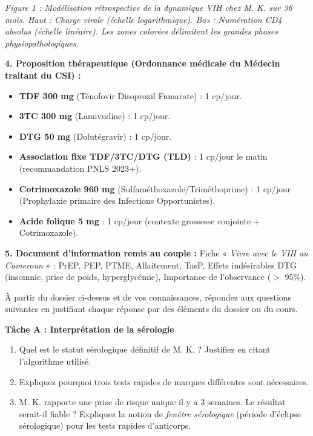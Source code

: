 \documentclass[11pt]{article}
\newcounter{popsec}
\newcounter{popsub}
\newcommand{\courssub}[1]{%
  \stepcounter{popsub}%
  \par\vspace{9pt}\noindent{\popxbold\fontsize{11.5}{13}\selectfont\color{popink}{\color{poporange}\thepopsec.\thepopsub}\hspace{6pt}#1}\par\nopagebreak\vspace{4pt}
}
\begin{document}
\begin{center}
\textit{Figure 1 : Modélisation rétrospective de la dynamique VIH chez M. K. sur 36 mois. Haut : Charge virale (échelle logarithmique). Bas : Numération CD4 absolus (échelle linéaire). Les zones colorées délimitent les grandes phases physiopathologiques.}
\end{center}

\textbf{4. Proposition thérapeutique (Ordonnance médicale du Médecin traitant du CSI) :}
\begin{itemize}
    \item \textbf{TDF 300 mg} (Ténofovir Disoproxil Fumarate) : 1 cp/jour.
    \item \textbf{3TC 300 mg} (Lamivudine) : 1 cp/jour.
    \item \textbf{DTG 50 mg} (Dolutégravir) : 1 cp/jour.
    \item \textbf{Association fixe TDF/3TC/DTG (TLD)} : 1 cp/jour le matin (recommandation PNLS 2023+).
    \item \textbf{Cotrimoxazole 960 mg} (Sulfaméthoxazole/Triméthoprime) : 1 cp/jour (Prophylaxie primaire des Infections Opportunistes).
    \item \textbf{Acide folique 5 mg} : 1 cp/jour (contexte grossesse conjointe + Cotrimoxazole).
\end{itemize}

\textbf{5. Document d'information remis au couple :} Fiche « \emph{Vivre avec le VIH au Cameroun} » : PrEP, PEP, PTME, Allaitement, TasP, Effets indésirables DTG (insomnie, prise de poids, hyperglycémie), Importance de l'observance ($>$ 95\%).

\courssub{Consignes}
À partir du dossier ci-dessus et de vos connaissances, répondez aux questions suivantes en justifiant chaque réponse par des éléments du dossier ou du cours.

\textbf{Tâche A : Interprétation de la sérologie}
\begin{enumerate}
    \item Quel est le statut sérologique définitif de M. K. ? Justifiez en citant l'algorithme utilisé.
    \item Expliquez pourquoi trois tests rapides de marques différentes sont nécessaires.
    \item M. K. rapporte une prise de risque unique il y a 3 semaines. Le résultat serait-il fiable ? Expliquez la notion de \emph{fenêtre sérologique} (période d'éclipse sérologique) pour les tests rapides d'anticorps.
\end{enumerate}
\end{document}
